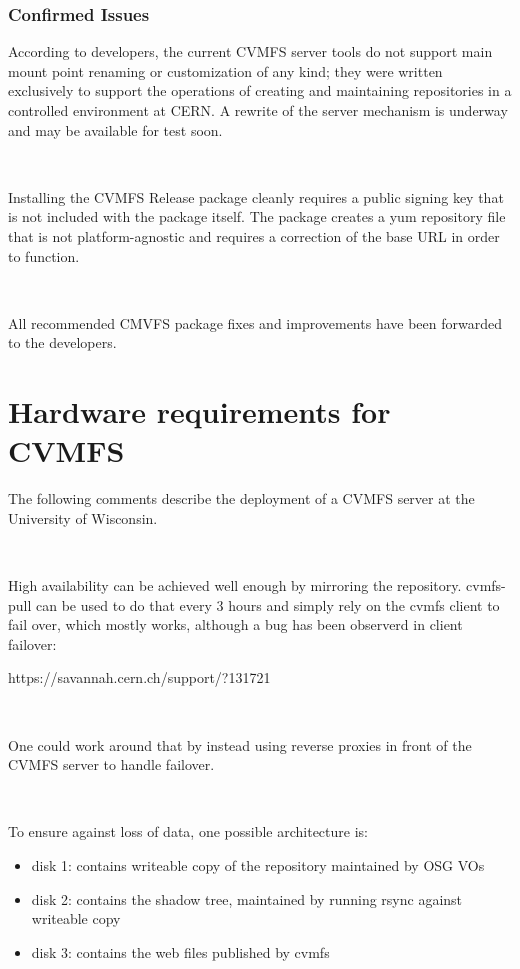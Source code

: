 \documentclass{article}
\begin{document}
\subsubsection{Confirmed Issues}

According to developers, the current CVMFS server tools do not support main mount point renaming or customization of any kind; 
they were written exclusively to support the operations of creating and maintaining repositories in a controlled environment at CERN.  
A rewrite of the server mechanism is underway and may be available for test soon.

~

Installing the CVMFS Release package cleanly requires a public signing key that is not included with the package itself. 
The package creates a yum repository file that is not platform-agnostic 
and requires a correction of the base URL in order to function.

~

All recommended CMVFS package fixes and improvements have been forwarded to the developers.

\newpage
\section{Hardware requirements for CVMFS}

The following comments describe the deployment of a CVMFS server at the University of Wisconsin. 

~

High availability can be achieved well enough by mirroring the repository.  
cvmfs-pull can be used to do that every 3 hours 
and simply rely on the cvmfs client to fail over, which mostly works, although a bug has been observerd in client failover:

https://savannah.cern.ch/support/?131721

~

One could work around that by instead using reverse proxies in front of the CVMFS server to handle failover.  

~

To ensure against loss of data, one possible architecture is:

\begin{itemize} 
\item disk 1: contains writeable copy of the repository maintained by OSG VOs
\item disk 2: contains the shadow tree, maintained by running rsync against writeable copy
\item disk 3: contains the web files published by cvmfs
\end{itemize} 
\end{document}
